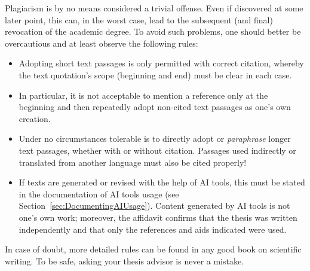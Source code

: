 Plagiarism is by no means considered a trivial offense. Even if discovered at some later
point, this can, in the worst case, lead to the subsequent (and final) revocation of the
academic degree. To avoid such problems, one should better be overcautious and at
least observe the following rules:
%
\begin{itemize}
    \item
    Adopting short text passages is only permitted with correct citation,
    whereby the text quotation's scope (beginning and end) must be clear in each
    case.
    \item
    In particular, it is not acceptable to mention a reference only at the
    beginning and then repeatedly adopt non-cited text passages as
    one's own creation.
    \item
    Under no circumstances tolerable is to directly adopt or \emph{paraphrase}
    longer text passages, whether with or without citation. Passages used
    indirectly or translated from another language must also be cited properly!
    \item
    If texts are generated or revised with the help of AI tools, this must be
    stated in the documentation of AI tools usage (see
    Section~\ref{sec:DocumentingAIUsage}). Content generated by AI tools is not
    one's own work; moreover, the affidavit confirms that the thesis was written
    independently and that only the references and aids indicated were used.
\end{itemize}
%
In case of doubt, more detailed rules can be found in any good book on
scientific writing. To be safe, asking your thesis advisor is never a mistake.
